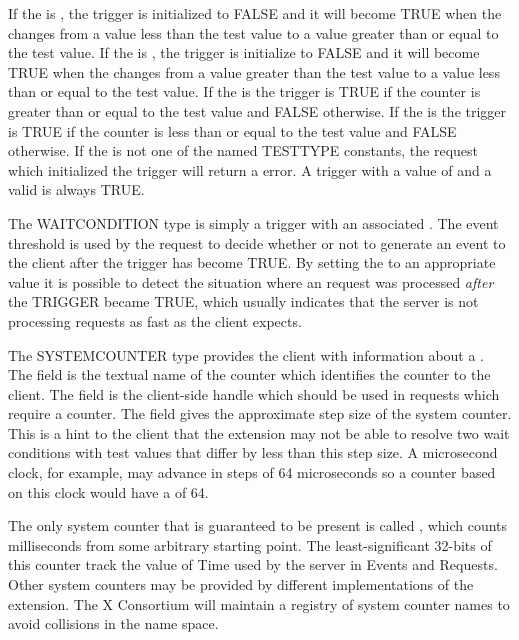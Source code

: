 If the  is , the trigger is
initialized to FALSE and it will become TRUE when the  changes
from a value less than the test value to a value greater than or equal to the
test value. If the  is , the
trigger is initialize to FALSE and it will become TRUE when the
 changes from a value greater than the test value to a value
less than or equal to the test value. If the  is
 the trigger is TRUE if the counter is greater than or
equal to the test value and FALSE otherwise.  If the  is
 the trigger is TRUE if the counter is less than or
equal to the test value and FALSE otherwise. If the 
is not one of the named TESTTYPE constants, the request which
initialized the trigger will return a  error.  A trigger
with a  value of  and a valid 
is always TRUE.

The WAITCONDITION type is simply a trigger with an associated
.  The event threshold is used by the 
request to decide whether or not to generate an event to the client after the
trigger has become TRUE. By setting the  to an
appropriate value it is possible to detect the situation where an
 request was processed {\it after} the TRIGGER became TRUE,
which usually indicates that the server is not processing requests as fast as
the client expects.

The SYSTEMCOUNTER type provides the client with information about a
. The  field is the textual name of the
counter which identifies the counter to the client. The  field
is the client-side handle which should be used in requests which require a
counter. The  field gives the approximate step size of the
system counter. This is a hint to the client that the extension may not be
able to resolve two wait conditions with test values that differ by less than
this step size. A microsecond clock, for example, may advance in steps of 64
microseconds so a counter based on this clock would have a 
of 64.

The only system counter that is guaranteed to be present is called
, which counts milliseconds from some arbitrary starting
point. The least-significant 32-bits of this counter track the value of Time
used by the server in Events and Requests. Other system counters may be
provided by different implementations of the extension. The X Consortium will
maintain a registry of system counter names to avoid collisions in the
name space.

